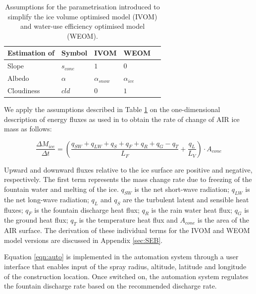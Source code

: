 \documentclass[tc, manuscript]{copernicus}
\begin{document}
\begin{table}[]
\centering
\caption{Assumptions for the parametrisation introduced to simplify the ice volume optimised model (IVOM) and
water-use efficiency optimised model (WEOM).}
\label{tab:assumptions}
\begin{tabular}{@{}lllll@{}}
\toprule
\textbf{Estimation of} & \textbf{Symbol} & \textbf{IVOM} & \textbf{WEOM} & \\ \midrule
\multicolumn{1}{|l}{Slope}        & $s_{cone}$ & $ 1 $ & $0$ & \multicolumn{1}{l|}{} \\ \midrule
\multicolumn{1}{|l}{Albedo} & $\alpha$ & $\alpha_{snow}$ & $\alpha_{ice}$ & \multicolumn{1}{l|}{} \\\midrule 
\multicolumn{1}{|l}{Cloudiness}  & $cld$ & $0$ & $1$ & \multicolumn{1}{l|}{} \\ \bottomrule
\end{tabular}
\end{table}

We apply the assumptions described in Table \ref{tab:assumptions} on the one-dimensional description of energy
fluxes as used in \cite{balasubramanianInfluenceMeteorologicalConditions2022} to obtain the rate of change of
AIR ice mass as follows: 

\begin{equation}
  \frac{\Delta M_{ice}}{\Delta t}  =  (\frac{q_{SW} + q_{LW} + q_{S} + q_{F} + q_{R} + q_{G} - q_{T}}{L_F} + \frac{q_{L}}{L_V} ) \cdot A_{cone}
	\label{eqn:auto}
\end{equation}

Upward and downward fluxes relative to the ice surface are positive and negative, respectively. The first term
represents the mass change rate due to freezing of the fountain water and melting of the ice. $q_{SW}$ is the
net short-wave radiation; $q_{LW}$ is the net long-wave radiation; $q_{L}$ and $q_{S}$ are the turbulent latent
and sensible heat fluxes; $q_{F}$ is the fountain discharge heat flux; $q_{R}$ is the rain water heat flux;
$q_{G}$ is the ground heat flux; $q_{T}$ is the temperature heat flux and $A_{cone}$ is the area of the AIR
surface. The derivation of these individual terms for the IVOM and WEOM model versions are discussed in 
Appendix \ref{sec:SEB}.

Equation \ref{eqn:auto} is implemented in the automation system through a user interface that enables input of
the spray radius, altitude, latitude and longitude of the construction location. Once switched on, the
automation system regulates the fountain discharge rate based on the recommended discharge rate.
\end{document}
